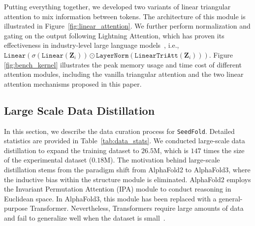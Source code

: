 Putting everything together, we developed two variants of linear triangular attention to mix information between tokens. The architecture of this module is illustrated in Figure~\ref{fig:linear_attention}. We further perform normalization and gating on the output following Lightning Attention, which has proven its effectiveness in industry-level large language models~\cite{qin2024lightning, qin2024transnormerllm, minimax2025minimax01scalingfoundationmodels}, i.e., $\mathtt{Linear}(\sigma(\mathtt{Linear}(\mathbf{Z}_i))\odot\mathtt{LayerNorm}(\mathtt{LinearTriAtt}(\mathbf{Z}_i)))$. Figure \ref{fig:bench_kernel} illustrates the peak memory usage and time cost of different attention modules, including the vanilla triangular attention and the two linear attention mechanisms proposed in this paper.









\subsection{Large Scale Data Distillation}
\label{sec:data_scaling}

In this section, we describe the data curation process for \texttt{SeedFold}. Detailed statistics are provided in Table~\ref{tab:data_stats}. We conducted large-scale data distillation to expand the training dataset to $26.5$M, which is $147$ times the size of the experimental dataset ($0.18$M). The motivation behind large-scale distillation stems from the paradigm shift from AlphaFold2 to AlphaFold3, where the inductive bias within the structure module is eliminated. AlphaFold2 employs the Invariant Permutation Attention (IPA) module to conduct reasoning in Euclidean space. In AlphaFold3, this module has been replaced with a general-purpose Transformer. Nevertheless, Transformers require large amounts of data and fail to generalize well when the dataset is small~\cite{dosovitskiy2020image}.

